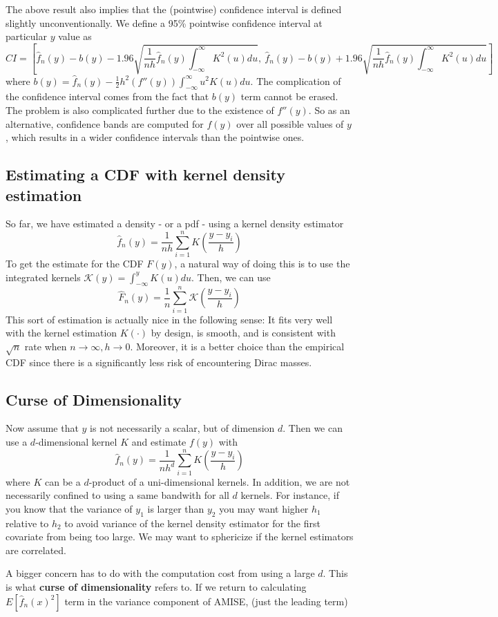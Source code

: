 \documentclass[12pt]{article}
\theoremstyle{definition}
\theoremstyle{property}
\theoremstyle{assumption}
\theoremstyle{example}
\theoremstyle{comment}
\begin{document}
The above result also implies that the (pointwise) confidence interval is defined slightly unconventionally. We define a 95\% pointwise confidence interval at particular $y$ value as
\small{\[
CI = \left[\hat{f}_n(y)-b(y)-1.96\sqrt{\frac{1}{nh}\hat{f}_n(y) \int_{-\infty}^\infty K^2(u)du},\ \hat{f}_n(y)-b(y)+1.96\sqrt{\frac{1}{nh}\hat{f}_n(y) \int_{-\infty}^\infty K^2(u)du}\right]
\]}\normalsize
where $b(y)=\hat{f}_n(y)-\frac{1}{2}h^2(f''(y))\int_{-\infty}^\infty u^2K(u)du$. The complication of the confidence interval comes from the fact that $b(y)$ term cannot be erased. The problem is also complicated further due to the existence of $f''(y)$.  So as an alternative, confidence bands are computed for $f(y)$ over all possible values of $y$, which results in a wider confidence intervals than the pointwise ones. 
\subsection{Estimating a CDF with kernel density estimation}
So far, we have estimated a density - or a pdf - using a kernel density estimator
\[
\hat{f}_n(y) = \frac{1}{nh}\sum_{i=1}^nK\left(\frac{y-y_i}{h}\right)
\]
To get the estimate for the CDF $F(y)$, a natural way of doing this is to use the integrated kernels $\mathcal{K}(y)=\int_{-\infty}^yK(u)du$. Then, we can use
\[
\widehat{F}_n(y) = \frac{1}{n}\sum_{i=1}^n \mathcal{K}\left(\frac{y-y_i}{h}\right)
\]
This sort of estimation is actually nice in the following sense: It fits very well with the kernel estimation $K(\cdot)$ by design, is smooth, and is consistent with $\sqrt{n}$ rate when $n\to\infty, h\to0$. Moreover, it is a better choice than the empirical CDF since there is a significantly less risk of encountering Dirac masses. 

 \subsection{Curse of Dimensionality}
 Now assume that $y$ is not necessarily a scalar, but of dimension $d$. Then we can use a $d$-dimensional kernel $K$ and estimate $f(y)$ with
 \[
 \hat{f}_n(y)= \frac{1}{nh^d}\sum_{i=1}^nK\left(\frac{y-y_i}{h}\right)
 \]
 where $K$ can be a $d$-product of a uni-dimensional kernels. In addition, we are not necessarily confined to using a same bandwith for all $d$ kernels. For instance, if you know that the variance of $y_1$ is larger than $y_2$ you may want higher $h_1$ relative to $h_2$ to avoid variance of the kernel density estimator for the first covariate from being too large. We may want to sphericize if the kernel estimators are correlated. \par
 A bigger concern has to do with the computation cost from using a large $d$. This is what \textbf{curse of dimensionality} refers to. If we return to calculating $E[\hat{f}_n(x)^2]$ term in the variance component of AMISE, (just the leading term)
 
\end{document}
